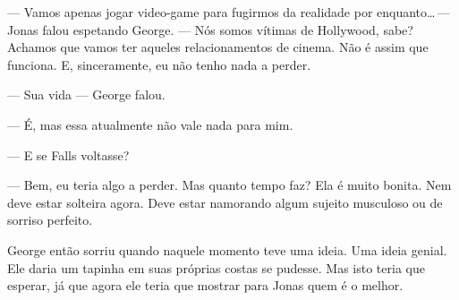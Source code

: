 --- Vamos apenas jogar video-game para fugirmos da realidade por enquanto\ldots\,--- Jonas falou\mudanca{,} espetando George. --- Nós somos vítimas de Hollywood, sabe? Achamos que vamos ter aqueles relacionamentos de cinema. Não é assim que funciona. E, sinceramente, eu não tenho nada a perder.

--- Sua vida --- George falou.

--- É, mas essa atualmente não vale nada para mim.

--- E se Falls voltasse?

--- Bem, eu teria algo a perder. Mas quanto tempo faz? Ela é muito bonita. Nem deve estar solteira agora. Deve estar namorando algum sujeito musculoso ou de sorriso perfeito.

George então sorriu quando\mudanca{,} naquele momento\mudanca{,} teve uma ideia. Uma ideia genial. Ele daria um tapinha em suas próprias costas se pudesse. Mas isto teria que esperar, já que agora ele teria que mostrar para Jonas quem é o melhor.
